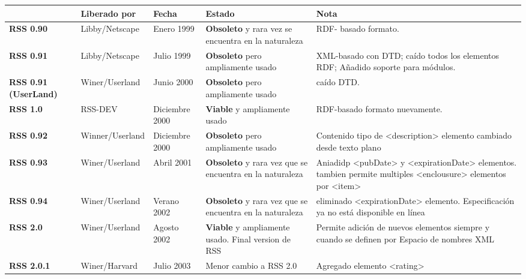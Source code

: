 \begin{minipage}[b]{\hsize}\centering

\begin{tabular}{>{\centering\arraybackslash}m{.05\linewidth} |>{\centering\arraybackslash}m{.17\linewidth}|>{\centering\arraybackslash}m{.1\linewidth}|>{\centering\arraybackslash}m{.2\linewidth}|>{\centering\arraybackslash}m{.4\linewidth}}

& \textbf{Liberado por} & \textbf{Fecha} & \textbf{Estado} & \textbf{Nota} \\
\hline

\textbf{RSS 0.90} & Libby/Netscape & Enero 1999 & \textbf{Obsoleto} y rara vez se encuentra en la naturaleza & RDF- basado formato. \\
\hline

\textbf{RSS 0.91 } & Libby/Netscape & Julio 1999 & \textbf{Obsoleto} pero ampliamente usado & XML-basado con DTD; caído todos los elementos RDF; Añadido soporte para módulos. \\
\hline 

\textbf{RSS 0.91 (UserLand) } & Winer/Userland & Junio 2000 & \textbf{Obsoleto} pero ampliamente usado & caído DTD. \\
\hline 

\textbf{RSS 1.0} & RSS-DEV & Diciembre 2000 & \textbf{Viable} y ampliamente usado & RDF-basado formato nuevamente.\\
\hline

\textbf{RSS 0.92} & Winner/Userland & Diciembre 2000 & \textbf{Obsoleto} pero ampliamente usado & Contenido tipo de <description> elemento cambiado desde texto plano\\
\hline

\textbf{RSS 0.93} & Winer/Userland & Abril 2001 & \textbf{Obsoleto} y rara vez que se encuentra en la naturaleza & Aniadidp <pubDate> y <expirationDate> elementos. tambien permite multiples <enclousure> elementos por <item> \\
\hline

\textbf{RSS 0.94} & Winer/Userland & Verano 2002 & \textbf{Obsoleto} y rara vez que se encuentra en la naturaleza & eliminado <expirationDate> elemento. Especificación ya no está disponible en línea\\
\hline

\textbf{RSS 2.0} & Winer/Userland & Agosto 2002 & \textbf{Viable} y ampliamente usado. Final version de RSS & Permite adición de nuevos elementos siempre y cuando se definen por Espacio de nombres XML\\
\hline 

\textbf{RSS 2.0.1} & Winer/Harvard & Julio 2003 & Menor cambio a RSS 2.0 & Agregado elemento <rating>\\
\hline 

\end{tabular}

\end{minipage}

